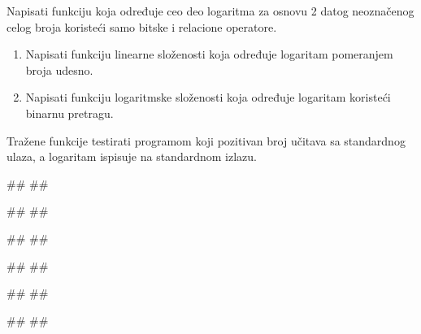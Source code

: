 \begin{Answer}[ref=3_09]
\end{Answer}
\begin{Exercise}[label=3_10]
  Napisati funkciju koja određuje ceo deo logaritma za osnovu 2 datog
  neoznačenog celog broja koristeći samo bitske i relacione
  operatore.
  \begin{enumerate}
  \item Napisati funkciju linearne složenosti koja određuje
    logaritam pomeranjem broja udesno.
  \item Napisati funkciju logaritmske složenosti koja određuje
    logaritam koristeći binarnu pretragu.
  \end{enumerate}
  Tražene funkcije testirati programom koji pozitivan broj učitava sa
  standardnog ulaza, a logaritam ispisuje na standardnom izlazu.

\begin{minitest}
\begin{test}{1}
#\naslovUlaz#
##
  
#\naslovIzlaz#
##
\end{test}
\end{minitest}
\begin{minitest}
\begin{test}{2}
#\naslovUlaz#
##
  
#\naslovIzlaz#
##
\end{test}
\end{minitest}
\begin{minitest}
\begin{test}{3}
#\naslovUlaz#
##
  
#\naslovIzlaz#
##
\end{test}
\end{minitest}


\end{Exercise}

